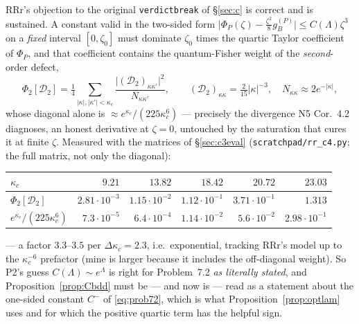 \documentclass[11pt]{article}
\newcommand{\abs}[1]{\lvert#1\rvert}
\begin{document}
RRr's objection to the original \texttt{verdictbreak} of \S\ref{sec:c} is correct and is sustained.
A constant valid in the two-sided form
$\bigl|\Phi_P(\zeta)-\frac{\zeta^2}8g_B^{(P)}\bigr|\le C(\Lambda)\zeta^3$ on a \emph{fixed} interval
$[0,\zeta_0]$ must dominate $\zeta_0$ times the quartic Taylor coefficient of $\Phi_P$, and that
coefficient contains the quantum-Fisher weight of the \emph{second}-order defect,
\begin{equation}\label{eq:quarticterm}
 \Phi_2[\mathcal D_2]=\tfrac14\sum_{\abs\kappa,\abs{\kappa'}<\kappa_c}
 \frac{\abs{(\mathcal D_2)_{\kappa\kappa'}}^2}{N_{\kappa\kappa'}},\qquad
 (\mathcal D_2)_{\kappa\kappa}=\tfrac2{15}\abs\kappa^{-3},\quad N_{\kappa\kappa}\approx2e^{-\abs\kappa},
\end{equation}
whose diagonal alone is $\approx e^{\kappa_c}/(225\kappa_c^6)$ --- precisely the divergence N5
Cor.~4.2 diagnoses, an honest derivative at $\zeta=0$, untouched by the saturation that cures it at
finite $\zeta$.  Measured with the matrices of \S\ref{sec:c3eval}
(\texttt{scratchpad/rr\_c4.py}; the full matrix, not only the diagonal):
\begin{center}\small
\begin{tabular}{lrrrrr}\toprule
$\kappa_c$ & $9.21$ & $13.82$ & $18.42$ & $20.72$ & $23.03$\\\midrule
$\Phi_2[\mathcal D_2]$ & $2.81\cdot10^{-3}$ & $1.15\cdot10^{-2}$ & $1.12\cdot10^{-1}$ &
 $3.71\cdot10^{-1}$ & $1.313$\\
$e^{\kappa_c}/(225\kappa_c^6)$ & $7.3\cdot10^{-5}$ & $6.4\cdot10^{-4}$ & $1.14\cdot10^{-2}$ &
 $5.6\cdot10^{-2}$ & $2.98\cdot10^{-1}$\\
\bottomrule\end{tabular}\end{center}
--- a factor $3.3$--$3.5$ per $\Delta\kappa_c=2.3$, i.e.\ exponential, tracking RRr's model up to the
$\kappa_c^{-6}$ prefactor (mine is larger because it includes the off-diagonal weight).  So P2's
guess $C(\Lambda)\sim e^\Lambda$ is right for Problem~7.2 \emph{as literally stated}, and
Proposition~\ref{prop:Cbdd} must be --- and now is --- read as a statement about the one-sided
constant $C^-$ of \eqref{eq:prob72}, which is what Proposition~\ref{prop:optlam} uses and for which
the positive quartic term has the helpful sign.
\end{document}
